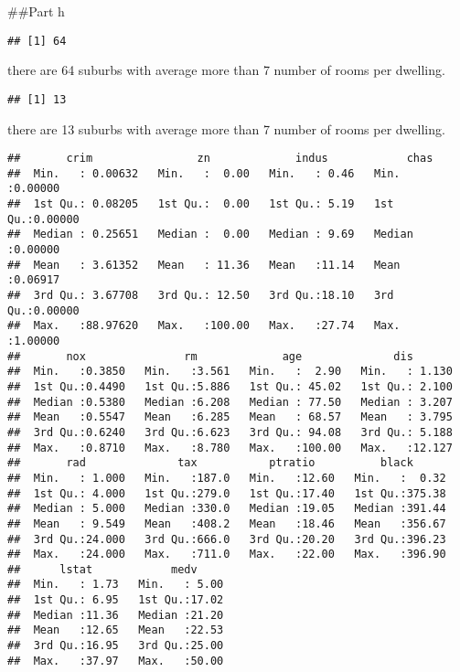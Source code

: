 \documentclass[
]{article}
\begin{document}
\#\#Part h

\begin{verbatim}
## [1] 64
\end{verbatim}

there are 64 suburbs with average more than 7 number of rooms per
dwelling.

\begin{verbatim}
## [1] 13
\end{verbatim}

there are 13 suburbs with average more than 7 number of rooms per
dwelling.

\begin{verbatim}
##       crim                zn             indus            chas        
##  Min.   : 0.00632   Min.   :  0.00   Min.   : 0.46   Min.   :0.00000  
##  1st Qu.: 0.08205   1st Qu.:  0.00   1st Qu.: 5.19   1st Qu.:0.00000  
##  Median : 0.25651   Median :  0.00   Median : 9.69   Median :0.00000  
##  Mean   : 3.61352   Mean   : 11.36   Mean   :11.14   Mean   :0.06917  
##  3rd Qu.: 3.67708   3rd Qu.: 12.50   3rd Qu.:18.10   3rd Qu.:0.00000  
##  Max.   :88.97620   Max.   :100.00   Max.   :27.74   Max.   :1.00000  
##       nox               rm             age              dis        
##  Min.   :0.3850   Min.   :3.561   Min.   :  2.90   Min.   : 1.130  
##  1st Qu.:0.4490   1st Qu.:5.886   1st Qu.: 45.02   1st Qu.: 2.100  
##  Median :0.5380   Median :6.208   Median : 77.50   Median : 3.207  
##  Mean   :0.5547   Mean   :6.285   Mean   : 68.57   Mean   : 3.795  
##  3rd Qu.:0.6240   3rd Qu.:6.623   3rd Qu.: 94.08   3rd Qu.: 5.188  
##  Max.   :0.8710   Max.   :8.780   Max.   :100.00   Max.   :12.127  
##       rad              tax           ptratio          black       
##  Min.   : 1.000   Min.   :187.0   Min.   :12.60   Min.   :  0.32  
##  1st Qu.: 4.000   1st Qu.:279.0   1st Qu.:17.40   1st Qu.:375.38  
##  Median : 5.000   Median :330.0   Median :19.05   Median :391.44  
##  Mean   : 9.549   Mean   :408.2   Mean   :18.46   Mean   :356.67  
##  3rd Qu.:24.000   3rd Qu.:666.0   3rd Qu.:20.20   3rd Qu.:396.23  
##  Max.   :24.000   Max.   :711.0   Max.   :22.00   Max.   :396.90  
##      lstat            medv      
##  Min.   : 1.73   Min.   : 5.00  
##  1st Qu.: 6.95   1st Qu.:17.02  
##  Median :11.36   Median :21.20  
##  Mean   :12.65   Mean   :22.53  
##  3rd Qu.:16.95   3rd Qu.:25.00  
##  Max.   :37.97   Max.   :50.00
\end{verbatim}
\end{document}
